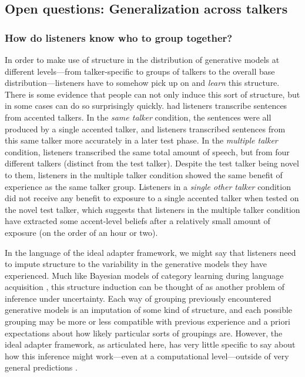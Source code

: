 \subsection{Open questions: Generalization across talkers }
\label{sec:open-questions-gen}
\label{r1-gen-questions}

\subsubsection{How do listeners know who to group together?}
\label{sec:how-do-listeners}

In order to make use of structure in the distribution of generative models at different levels---from talker-specific to groups of talkers to the overall base distribution---listeners have to somehow pick up on and \emph{learn} this structure.  There is some evidence that people can not only induce this sort of structure, but in some cases can do so surprisingly quickly.  \textcite{Bradlow2008} had listeners transcribe sentences from accented talkers.  In the \emph{same talker} condition, the sentences were all produced by a single accented talker, and listeners transcribed sentences from this same talker more accurately in a later test phase.  In the \emph{multiple talker} condition, listeners transcribed the same total amount of speech, but from four different talkers (distinct from the test talker).  Despite the test talker being novel to them, listeners in the multiple talker condition showed the same benefit of experience as the same talker group.  Listeners in a \emph{single other talker} condition did not receive any benefit to exposure to a single accented talker when tested on the novel test talker, which suggests that listeners in the multiple talker condition have extracted some accent-level beliefs after a relatively small amount of exposure (on the order of an hour or two).

In the language of the ideal adapter framework, we might say that listeners need to impute structure to the variability in the generative models they have experienced.  Much like Bayesian models of category learning during language acquisition \autocite[e.g.][]{Feldman2013a,Perfors2011}, this structure induction can be thought of as another problem of inference under uncertainty.  Each way of grouping previously encountered generative models is an imputation of some kind of structure, and each possible grouping may be more or less compatible with previous experience and a priori expectations about how likely particular sorts of groupings are.  However, the ideal adapter framework, as articulated here, has very little specific to say about how this inference might work---even at a computational level---outside of very general predictions \autocites[e.g. simpler groupings are naturally preferred because of the Occam's razor property of Bayesian inference;][]{Perfors2011}[pp. 343-356]{Mackay2003}.

